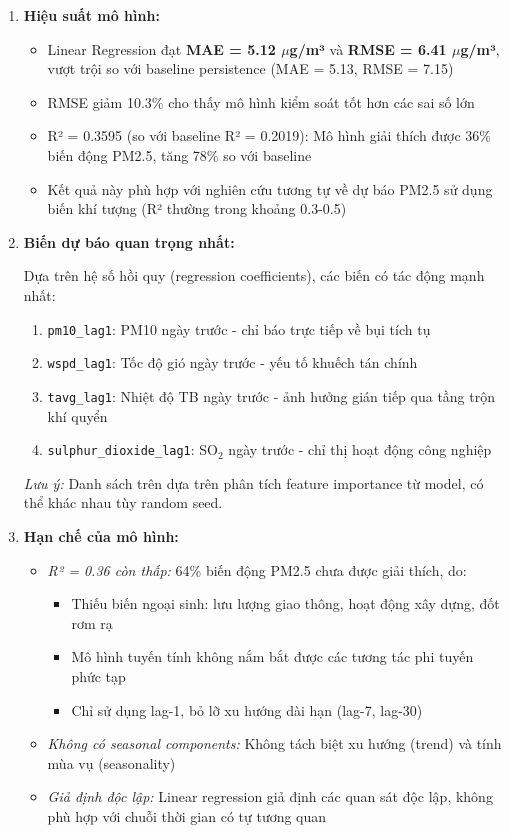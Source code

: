 \documentclass[12pt,a4paper]{article}
\begin{document}
\begin{enumerate}
    \item \textbf{Hiệu suất mô hình:}
    \begin{itemize}
        \item Linear Regression đạt \textbf{MAE = 5.12 $\mu$g/m³} và \textbf{RMSE = 6.41 $\mu$g/m³}, vượt trội so với baseline persistence (MAE = 5.13, RMSE = 7.15)
        \item RMSE giảm 10.3\% cho thấy mô hình kiểm soát tốt hơn các sai số lớn
        \item R² = 0.3595 (so với baseline R² = 0.2019): Mô hình giải thích được 36\% biến động PM2.5, tăng 78\% so với baseline
        \item Kết quả này phù hợp với nghiên cứu tương tự về dự báo PM2.5 sử dụng biến khí tượng (R² thường trong khoảng 0.3-0.5)
    \end{itemize}
    
    \item \textbf{Biến dự báo quan trọng nhất:}
    
    Dựa trên hệ số hồi quy (regression coefficients), các biến có tác động mạnh nhất:
    \begin{enumerate}
        \item \texttt{pm10\_lag1}: PM10 ngày trước - chỉ báo trực tiếp về bụi tích tụ
        \item \texttt{wspd\_lag1}: Tốc độ gió ngày trước - yếu tố khuếch tán chính
        \item \texttt{tavg\_lag1}: Nhiệt độ TB ngày trước - ảnh hưởng gián tiếp qua tầng trộn khí quyển
        \item \texttt{sulphur\_dioxide\_lag1}: SO$_2$ ngày trước - chỉ thị hoạt động công nghiệp
    \end{enumerate}
    
    \textit{Lưu ý:} Danh sách trên dựa trên phân tích feature importance từ model, có thể khác nhau tùy random seed.
    
    \item \textbf{Hạn chế của mô hình:}
    \begin{itemize}
        \item \textit{R² = 0.36 còn thấp:} 64\% biến động PM2.5 chưa được giải thích, do:
        \begin{itemize}
            \item Thiếu biến ngoại sinh: lưu lượng giao thông, hoạt động xây dựng, đốt rơm rạ
            \item Mô hình tuyến tính không nắm bắt được các tương tác phi tuyến phức tạp
            \item Chỉ sử dụng lag-1, bỏ lỡ xu hướng dài hạn (lag-7, lag-30)
        \end{itemize}
        \item \textit{Không có seasonal components:} Không tách biệt xu hướng (trend) và tính mùa vụ (seasonality)
        \item \textit{Giả định độc lập:} Linear regression giả định các quan sát độc lập, không phù hợp với chuỗi thời gian có tự tương quan
    \end{itemize}
    

\end{enumerate}
\end{document}
